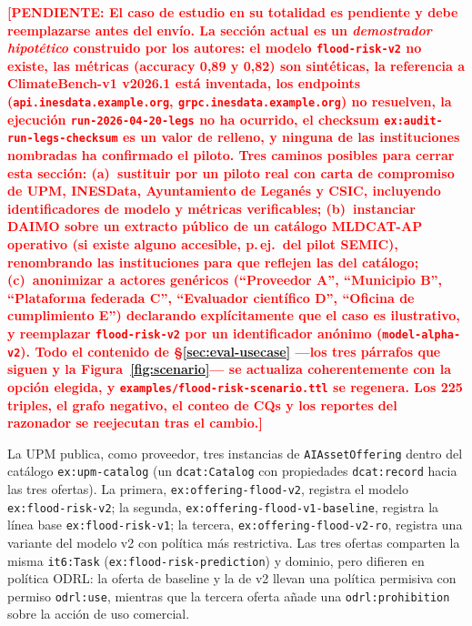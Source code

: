 \documentclass[11pt,a4paper]{article}
\newcommand{\code}[1]{\texttt{#1}}
\newcommand{\TODO}[1]{\textcolor{red}{\textbf{[PENDIENTE: #1]}}}
\begin{document}
\TODO{El caso de estudio en su totalidad es pendiente y debe reemplazarse antes del envío. La sección actual es un \emph{demostrador hipotético} construido por los autores: el modelo \texttt{flood-risk-v2} no existe, las métricas (accuracy 0,89 y 0,82) son sintéticas, la referencia a ClimateBench-v1 v2026.1 está inventada, los endpoints (\texttt{api.inesdata.example.org}, \texttt{grpc.inesdata.example.org}) no resuelven, la ejecución \texttt{run-2026-04-20-legs} no ha ocurrido, el checksum \texttt{ex:audit-run-legs-checksum} es un valor de relleno, y ninguna de las instituciones nombradas ha confirmado el piloto. Tres caminos posibles para cerrar esta sección: (a)~sustituir por un piloto real con carta de compromiso de UPM, INESData, Ayuntamiento de Leganés y CSIC, incluyendo identificadores de modelo y métricas verificables; (b)~instanciar DAIMO sobre un extracto público de un catálogo MLDCAT-AP operativo (si existe alguno accesible, p.\,ej.\ del pilot SEMIC), renombrando las instituciones para que reflejen las del catálogo; (c)~anonimizar a actores genéricos (``Proveedor A'', ``Municipio B'', ``Plataforma federada C'', ``Evaluador científico D'', ``Oficina de cumplimiento E'') declarando explícitamente que el caso es ilustrativo, y reemplazar \texttt{flood-risk-v2} por un identificador anónimo (\texttt{model-alpha-v2}). Todo el contenido de §\ref{sec:eval-usecase} ---los tres párrafos que siguen y la Figura~\ref{fig:scenario}--- se actualiza coherentemente con la opción elegida, y \code{examples/flood-risk-scenario.ttl} se regenera. Los 225 triples, el grafo negativo, el conteo de CQs y los reportes del razonador se reejecutan tras el cambio.}

La UPM publica, como proveedor, tres instancias de \code{AIAssetOffering} dentro del catálogo \code{ex:upm-catalog} (un \code{dcat:Catalog} con propiedades \code{dcat:record} hacia las tres ofertas). La primera, \code{ex:offering-flood-v2}, registra el modelo \code{ex:flood-risk-v2}; la segunda, \code{ex:offering-flood-v1-baseline}, registra la línea base \code{ex:flood-risk-v1}; la tercera, \code{ex:offering-flood-v2-ro}, registra una variante del modelo v2 con política más restrictiva. Las tres ofertas comparten la misma \code{it6:Task} (\code{ex:flood-risk-prediction}) y dominio, pero difieren en política ODRL: la oferta de baseline y la de v2 llevan una política permisiva con permiso \code{odrl:use}, mientras que la tercera oferta añade una \code{odrl:prohibition} sobre la acción de uso comercial.
\end{document}
